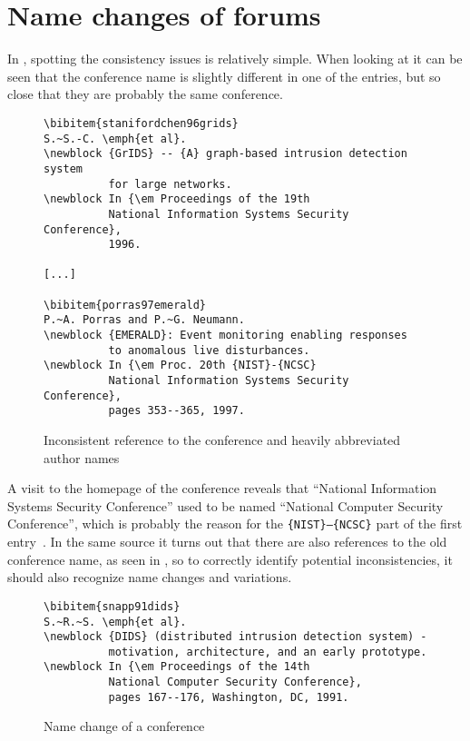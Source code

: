 \section{Name changes of forums}
\label{sec:problems_name_changes}

In , spotting the consistency
issues is relatively simple.  When looking at
 it can be seen that the
conference name is slightly different in one of the entries, but so
close that they are probably the same conference.

\begin{figure}
  \centering
\begin{small}
\begin{verbatim}
\bibitem{stanifordchen96grids}
S.~S.-C. \emph{et al}.
\newblock {GrIDS} -- {A} graph-based intrusion detection system
          for large networks.
\newblock In {\em Proceedings of the 19th
          National Information Systems Security Conference},
          1996.

[...]

\bibitem{porras97emerald}
P.~A. Porras and P.~G. Neumann.
\newblock {EMERALD}: Event monitoring enabling responses
          to anomalous live disturbances.
\newblock In {\em Proc. 20th {NIST}-{NCSC}
          National Information Systems Security Conference},
          pages 353--365, 1997.

\end{verbatim}
\end{small}
  \caption{Inconsistent reference to the conference and heavily abbreviated author names}
\label{fig:entry_journal_name_authors}
\end{figure}

A visit to the homepage of the conference reveals that ``National
Information Systems Security Conference'' used to be named ``National
Computer Security Conference'', which is probably the reason for the
\texttt{\{NIST\}--\{NCSC\}} part of the first entry~\cite{nist2014_nissc}.  In
the same source it turns out that there are also references to the old
conference name, as seen in , so to
correctly identify potential inconsistencies, it should also recognize
name changes and variations.

\begin{figure}
  \centering
\begin{small}
\begin{verbatim}
\bibitem{snapp91dids}
S.~R.~S. \emph{et al}.
\newblock {DIDS} (distributed intrusion detection system) -
          motivation, architecture, and an early prototype.
\newblock In {\em Proceedings of the 14th
          National Computer Security Conference},
          pages 167--176, Washington, DC, 1991.
\end{verbatim}
\end{small}
  \caption{Name change of a conference}
\label{fig:conference_name}
\end{figure}


